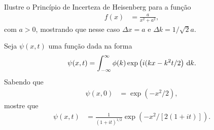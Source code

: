 \documentclass[a4paper,12pt, leqno, answers]{exam}
\begin{document}
\begin{questions}
    \question Ilustre o Princ\'{i}pio de Incerteza de Heisenberg para a
    fun\c{c}\~{a}o
    \begin{align*}
        f(x) &= \frac{a}{x^2 + a^2},
    \end{align*}
    com $a > 0$, mostrando que nesse caso $\Delta x = a$ e $\Delta k = 1 /
    \sqrt{2} a$.
    \begin{solution}
    \end{solution}

    \question Seja $\psi(x, t)$ uma fun\c{c}\~{a}o dada na forma
    \begin{align*}
        \psi(x, t) = \int_{-\infty}^\infty \phi(k) \exp\left( i (k x - k^2 t / 2
        \right) \, \mathrm{d}k.
    \end{align*}
    Sabendo que
    \begin{align*}
        \psi(x, 0) &= \exp(-x^2 / 2),
    \end{align*}
    mostre que
    \begin{align*}
        \psi(x, t) &= \frac{1}{(1 + i t)^{1/2}} \exp\left( -x^2 / \left[ 2 (1 +
        i t) \right] \right).
    \end{align*}
\end{questions}
% 
% 
\end{document}
